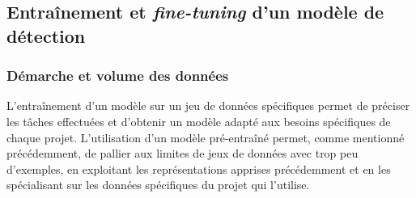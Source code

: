 \subsection{Entraînement et \textit{fine-tuning} d'un modèle de détection}
    \subsubsection{Démarche et volume des données}
	L'entraînement d'un modèle sur un jeu de données spécifiques permet de préciser les tâches effectuées et d'obtenir un modèle adapté aux besoins spécifiques de chaque projet. L'utilisation d'un modèle pré-entraîné permet, comme mentionné précédemment, de pallier aux limites de jeux de données avec trop peu d'exemples, en exploitant les représentations apprises précédemment et en les spécialisant sur les données spécifiques du projet qui l'utilise.
	
